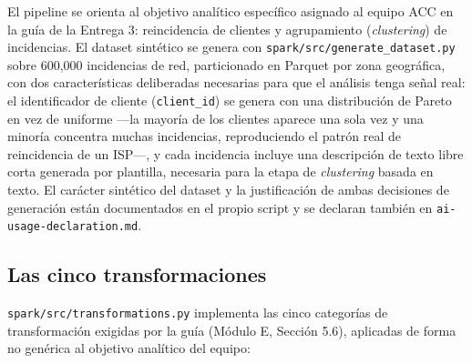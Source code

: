 \documentclass[11pt,letterpaper]{article}
\begin{document}
El pipeline se orienta al objetivo analítico específico asignado al equipo ACC en la guía de la
Entrega 3: reincidencia de clientes y agrupamiento (\emph{clustering}) de incidencias. El dataset
sintético se genera con \texttt{spark/src/generate\_dataset.py} sobre 600{,}000 incidencias de
red, particionado en Parquet por zona geográfica, con dos características deliberadas necesarias
para que el análisis tenga señal real: el identificador de cliente (\texttt{client\_id}) se genera
con una distribución de Pareto en vez de uniforme —la mayoría de los clientes aparece una sola vez
y una minoría concentra muchas incidencias, reproduciendo el patrón real de reincidencia de un
ISP—, y cada incidencia incluye una descripción de texto libre corta generada por plantilla,
necesaria para la etapa de \emph{clustering} basada en texto. El carácter sintético del dataset y
la justificación de ambas decisiones de generación están documentados en el propio script y se
declaran también en \texttt{ai-usage-declaration.md}.

\subsection{Las cinco transformaciones}

\texttt{spark/src/transformations.py} implementa las cinco categorías de transformación exigidas
por la guía (Módulo E, Sección 5.6), aplicadas de forma no genérica al objetivo analítico del
equipo:
\end{document}
